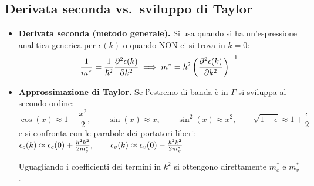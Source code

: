 \subsection{Derivata seconda vs.\ sviluppo di Taylor}

\begin{itemize}
    \item \textbf{Derivata seconda (metodo generale).} Si usa quando si ha un'espressione analitica generica per $\epsilon(k)$ o quando NON ci si trova in $k=0$:
\[ \frac{1}{m^*} = \frac{1}{\hbar^2}\frac{\partial^2\epsilon(k)}{\partial k^2} \implies m^*=\hbar^2\left(\frac{\partial^2\epsilon(k)}{\partial k^2}\right)^{-1} \]
\item \textbf{Approssimazione di Taylor.} Se l'estremo di banda è in $\Gamma$ si sviluppa al secondo ordine:
\[ \cos(x)\approx1-\frac{x^2}{2}, \qquad \sin(x)\approx x, \qquad \sin^2(x)\approx x^2, \qquad \sqrt{1+\epsilon}\approx1+\frac\epsilon2 \]
e si confronta con le parabole dei portatori liberi: $\epsilon_c(k)\approx\epsilon_c(0)+\frac{\hbar^2k^2}{2m_c^*}, \qquad \epsilon_v(k)\approx\epsilon_v(0)-\frac{\hbar^2k^2}{2m_v^*} $

Uguagliando i coefficienti dei termini in $k^2$ si ottengono direttamente $m_c^*$ e $m_v^*$.
\end{itemize}




